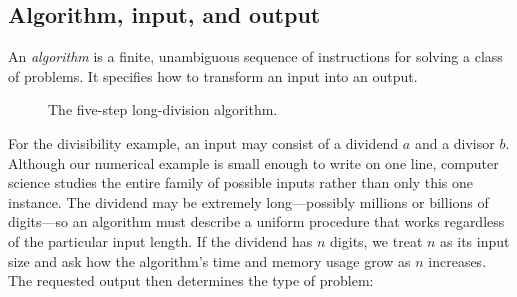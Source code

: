\documentclass[11pt]{article}
\begin{document}
\subsection{Algorithm, input, and output}

\begin{definition}[Algorithm]
An \emph{algorithm} is a finite, unambiguous sequence of instructions for solving a class of problems. It specifies how to transform an input into an output.
\end{definition}

\begin{figure}[htbp]
  \centering
  \caption{The five-step long-division algorithm.}
  \label{fig:long-division-algorithm}
\end{figure}

For the divisibility example, an input may consist of a dividend $a$ and a
divisor $b$. Although our numerical example is small enough to write on one
line, computer science studies the entire family of possible inputs rather than
only this one instance. The dividend may be extremely long---possibly millions
or billions of digits---so an algorithm must describe a uniform procedure that
works regardless of the particular input length. If the dividend has $n$ digits,
we treat $n$ as its input size and ask how the algorithm's time and memory usage
grow as $n$ increases. The requested output then determines the type of problem:
\end{document}
